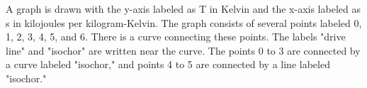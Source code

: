 A graph is drawn with the y-axis labeled as T in Kelvin and the x-axis labeled as s in kilojoules per kilogram-Kelvin. The graph consists of several points labeled 0, 1, 2, 3, 4, 5, and 6. There is a curve connecting these points. The labels "drive line" and "isochor" are written near the curve. The points 0 to 3 are connected by a curve labeled "isochor," and points 4 to 5 are connected by a line labeled "isochor."